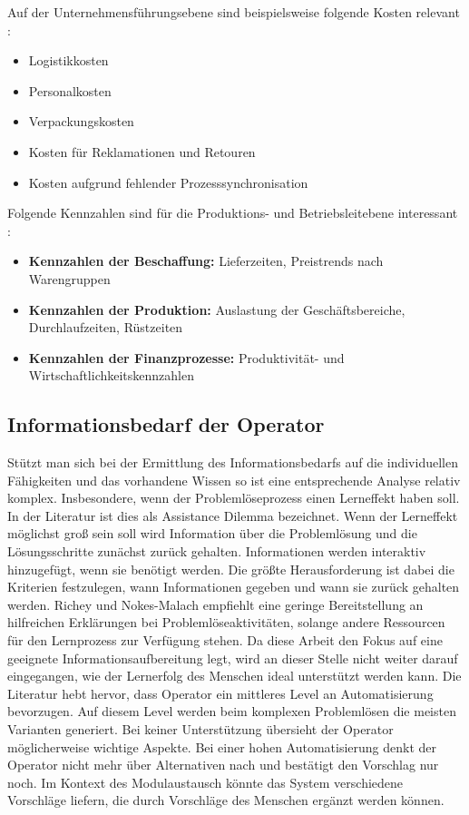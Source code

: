 Auf der Unternehmensführungsebene sind beispielsweise folgende Kosten relevant  \cite{Kunstler2014}:
\begin{itemize}
\item Logistikkosten
\item Personalkosten
\item Verpackungskosten
\item Kosten für Reklamationen und Retouren
\item Kosten aufgrund fehlender Prozesssynchronisation
\end{itemize}
Folgende Kennzahlen sind für die Produktions- und Betriebsleitebene interessant \cite{Kunstler2014}:
\begin{itemize}
\item \textbf{Kennzahlen der Beschaffung:} Lieferzeiten, Preistrends nach Warengruppen
\item \textbf{Kennzahlen der Produktion:} Auslastung der Geschäftsbereiche, Durchlaufzeiten, Rüstzeiten
\item \textbf{Kennzahlen der Finanzprozesse:} Produktivität- und Wirtschaftlichkeitskennzahlen
\end{itemize}

\subsection{Informationsbedarf der Operator}
\label{3:Informationsbedarf-Operator}
Stützt man sich bei der Ermittlung des Informationsbedarfs auf die individuellen Fähigkeiten und das vorhandene Wissen so ist eine entsprechende Analyse relativ komplex. Insbesondere, wenn der Problemlöseprozess einen Lerneffekt haben soll. In der Literatur ist dies als Assistance Dilemma bezeichnet. Wenn der Lerneffekt möglichst groß sein soll wird Information über die Problemlösung und die Lösungsschritte zunächst zurück gehalten. Informationen werden interaktiv hinzugefügt, wenn sie benötigt werden. Die größte Herausforderung ist dabei die Kriterien festzulegen, wann Informationen gegeben und wann sie zurück gehalten werden\cite{Koedinger2007}.  Richey und Nokes-Malach \cite{Richey2013} empfiehlt eine geringe Bereitstellung an hilfreichen Erklärungen bei Problemlöseaktivitäten, solange andere Ressourcen für den Lernprozess zur Verfügung stehen. Da diese Arbeit den Fokus auf eine geeignete Informationsaufbereitung legt, wird an dieser Stelle nicht weiter darauf eingegangen, wie der Lernerfolg des Menschen ideal unterstützt werden kann. Die Literatur \cite{Miller2005, Sauer2018} hebt hervor, dass Operator ein mittleres Level an Automatisierung bevorzugen. Auf diesem Level werden beim komplexen Problemlösen die meisten Varianten generiert. Bei keiner Unterstützung übersieht der Operator möglicherweise wichtige Aspekte. Bei einer hohen Automatisierung denkt der Operator nicht mehr über Alternativen nach und bestätigt den Vorschlag nur noch. \cite{Miller2005} Im Kontext des Modulaustausch könnte das System verschiedene Vorschläge liefern, die durch Vorschläge des Menschen ergänzt werden können.

